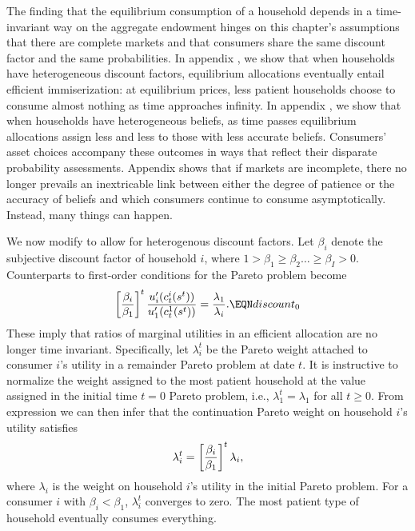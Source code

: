 \noindent
The  finding that the equilibrium consumption of a household
depends in a time-invariant way on the aggregate endowment hinges
 on this chapter's assumptions that there are  complete markets and  that
consumers  share the same  discount factor and the same probabilities.
In appendix , we show that when households have heterogeneous
discount factors,  equilibrium allocations eventually entail  efficient
 immiserization: at equilibrium prices,  less patient
households choose to consume almost nothing
as time approaches infinity.
In appendix , we show that when households have heterogeneous beliefs,  as  time passes  equilibrium allocations assign   less
and less  to those
with less accurate beliefs.
Consumers' asset choices accompany these outcomes in ways that reflect their disparate probability assessments.
Appendix  shows that if markets are incomplete, there no longer prevails an inextricable
link between  either the degree of patience or the
accuracy of beliefs and  which consumers continue to consume  asymptotically. Instead, many things can happen.




We now modify  to allow for heterogenous discount
factors.  Let $\beta_i$ denote
the subjective discount factor of household $i$, where
$1 > \beta_1\geq \beta_2 \ldots \geq \beta_I > 0$.
Counterparts to first-order conditions  for the
Pareto problem become
$$ \left[ \beta_i \over \beta_1 \right]^t
{u_i^\prime(c^i_t(s^t)) \over u_1^\prime(c^1_t(s^t))}
                   = {\lambda_1  \over \lambda_i}.  \EQN discount_0 $$
These imply that ratios of marginal utilities in an efficient allocation are no longer time invariant.
 Specifically, let $\lambda^t_i$ be the
Pareto weight attached to consumer $i$'s utility in a
remainder Pareto problem at date $t$. It is instructive to
normalize  the weight assigned to the
most patient household at the value assigned in the initial time $t=0$
Pareto problem, i.e., $\lambda^t_1 = \lambda_1$ for all $t\geq0$.
From expression  we can then infer that the continuation
Pareto weight on household $i$'s utility satisfies
$$
\lambda^t_i =  \left[ \beta_i \over \beta_1 \right]^t \lambda_i,
$$
where $\lambda_i$ is the weight on household $i$'s utility in the
initial Pareto problem.
For a consumer $i$ with  $\beta_i < \beta_1$, $\lambda^t_i$ converges to
zero.  The most patient type of household eventually
consumes everything.


